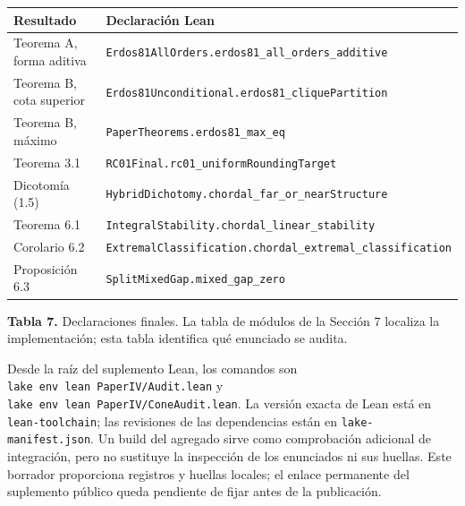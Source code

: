 \documentclass[spanish,11pt,a4paper]{article}
\newcounter{none}
\begin{document}

{\def\LTcaptype{none} %
\begin{longtable}[c]{@{}
  >{\raggedright\arraybackslash}p{}
  >{\raggedright\arraybackslash}p{}@{}}
\toprule\noalign{}
\begin{minipage}[b]{\linewidth}\raggedright
Resultado
\end{minipage} & \begin{minipage}[b]{\linewidth}\raggedright
Declaración Lean
\end{minipage} \\
\midrule\noalign{}
\endhead
\bottomrule\noalign{}
\endlastfoot
Teorema A, forma aditiva & \nolinkurl{Erdos81AllOrders.erdos81_all_orders_additive} \\
Teorema B, cota superior & \nolinkurl{Erdos81Unconditional.erdos81_cliquePartition} \\
Teorema B, máximo & \nolinkurl{PaperTheorems.erdos81_max_eq} \\
Teorema 3.1 & \nolinkurl{RC01Final.rc01_uniformRoundingTarget} \\
Dicotomía (1.5) & \nolinkurl{HybridDichotomy.chordal_far_or_nearStructure} \\
Teorema 6.1 & \nolinkurl{IntegralStability.chordal_linear_stability} \\
Corolario 6.2 & \nolinkurl{ExtremalClassification.chordal_extremal_classification} \\
Proposición 6.3 & \nolinkurl{SplitMixedGap.mixed_gap_zero} \\
\end{longtable}
}

\textbf{Tabla 7.} Declaraciones finales. La tabla de módulos de la Sección 7 localiza la implementación; esta tabla identifica qué enunciado se audita.

Desde la raíz del suplemento Lean, los comandos son \texttt{lake\ env\ lean\ PaperIV/Audit.lean} y \texttt{lake\ env\ lean\ PaperIV/ConeAudit.lean}. La versión exacta de Lean está en \nolinkurl{lean-toolchain}; las revisiones de las dependencias están en \nolinkurl{lake-manifest.json}. Un build del agregado sirve como comprobación adicional de integración, pero no sustituye la inspección de los enunciados ni sus huellas. Este borrador proporciona registros y huellas locales; el enlace permanente del suplemento público queda pendiente de fijar antes de la publicación.
\end{document}
